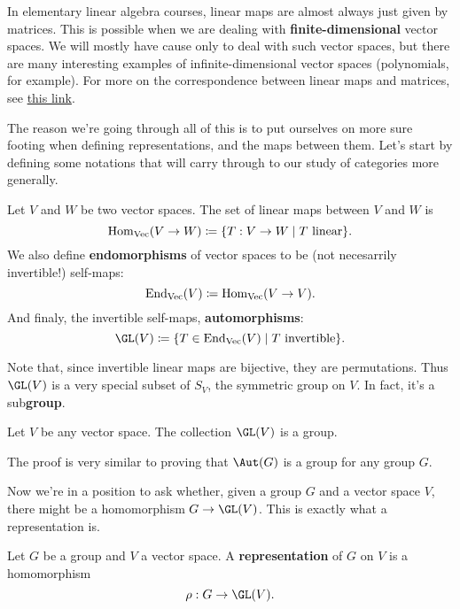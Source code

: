 In elementary linear algebra courses, linear maps are almost always just given by matrices.
This is possible when we are dealing with {\bf finite-dimensional} vector spaces.
We will mostly have cause only to deal with such vector spaces, but there are many interesting 
examples of infinite-dimensional vector spaces (polynomials, for example).
For more on the correspondence between linear maps and matrices, see 
\href{https://math.libretexts.org/Bookshelves/Linear_Algebra/Book%3A_Linear_Algebra_(Schilling_Nachtergaele_and_Lankham)/06%3A_Linear_Maps/6.06%3A_The_matrix_of_a_linear_map}{this link}.

The reason we're going through all of this is to put ourselves on more sure footing when defining representations,
and the maps between them. 
Let's start by defining some notations that will carry through to our study of categories more generally.

\begin{definition}
    Let $V$ and $W$ be two vector spaces.
    The set of linear maps between $V$ and $W$ is 
    \[
         \operatorname{Hom}_{\operatorname{Vec}}(V\to W) \coloneq \{ T:V\to W \mid \text{$T$ linear} \}.
    \]
    We also define {\bf endomorphisms} of vector spaces to be (not necesarrily invertible!)
    self-maps:
    \[
        \operatorname{End}_{\operatorname{Vec}}(V) \coloneq \operatorname{Hom}_{\operatorname{Vec}}(V\to V).
    \]
    And finaly, the invertible self-maps, {\bf automorphisms}:
    \[
        \GL(V) \coloneq \{ T\in\End_{\Vecc}(V) \mid \text{$T$ invertible} \}.
    \]
\end{definition}

Note that, since invertible linear maps are bijective, they are permutations.
Thus $\GL(V)$ is a very special subset of $S_V$, the symmetric group on $V$.
In fact, it's a sub{\bf group}.

\begin{proposition}
    Let $V$ be any vector space.
    The collection $\GL(V)$ is a group.
\end{proposition}

The proof is very similar to proving that $\Aut(G)$ is a group for any group $G$.

Now we're in a position to ask whether, given a group $G$ and a vector space $V$, there might
be a homomorphism $G\to \GL(V)$. This is exactly what a representation is.

\begin{definition}[Representation]
    Let $G$ be a group and $V$ a vector space.
    A {\bf representation} of $G$ on $V$ is a homomorphism 
    \[
        \rho:G\to\GL(V).
    \]
\end{definition}